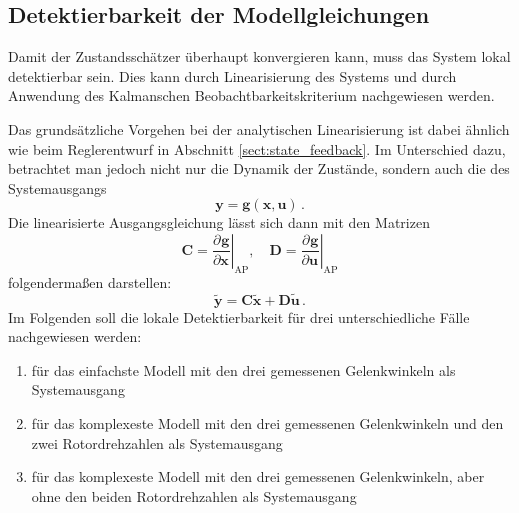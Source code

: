 \documentclass[10pt,twocolumn]{article}
\newcommand{\partiell}[3][]{\frac{\partial^{#1}#2}{\partial{#3}^{#1}}}
\newcommand{\vect}[1]{\boldsymbol #1}
\begin{document}
	\subsection{Detektierbarkeit der Modellgleichungen}
	Damit der Zustandsschätzer überhaupt konvergieren kann, muss das System lokal detektierbar sein. Dies kann durch Linearisierung des Systems und durch Anwendung des Kalmanschen Beobachtbarkeitskriterium nachgewiesen werden.

	Das grundsätzliche Vorgehen bei der analytischen Linearisierung ist dabei ähnlich wie beim Reglerentwurf in Abschnitt \ref{sect:state_feedback}.
	Im Unterschied dazu, betrachtet man jedoch nicht nur die Dynamik der Zustände, sondern auch die des Systemausgangs
	\begin{equation}
	\bm y = \bm{g}(\bm{x}, \bm u)\, .
	\end{equation}
	Die linearisierte Ausgangsgleichung lässt sich dann mit den Matrizen
	\begin{equation}
	\vect{C} = \left. \partiell{\vect g}{\vect x}\right\vert_\mathrm{AP}, \quad
	\vect D = \left. \partiell{\vect g}{\vect u}\right\vert_\mathrm{AP}
	\end{equation}
	folgendermaßen darstellen:
	\begin{equation}
	\tilde{\vect{y}} = \vect C \tilde{\vect{x}} + \vect D \tilde{\vect{u}}\, .
	\end{equation}
	Im Folgenden soll die lokale Detektierbarkeit für drei unterschiedliche Fälle nachgewiesen werden:
	\begin{enumerate}
		\item für das einfachste Modell mit den drei gemessenen Gelenkwinkeln als Systemausgang
		\item für das komplexeste Modell mit den drei gemessenen Gelenkwinkeln und den zwei Rotordrehzahlen als Systemausgang
		\item für das komplexeste Modell mit den drei gemessenen Gelenkwinkeln, aber ohne den beiden Rotordrehzahlen als Systemausgang
	\end{enumerate}
	
\end{document}
